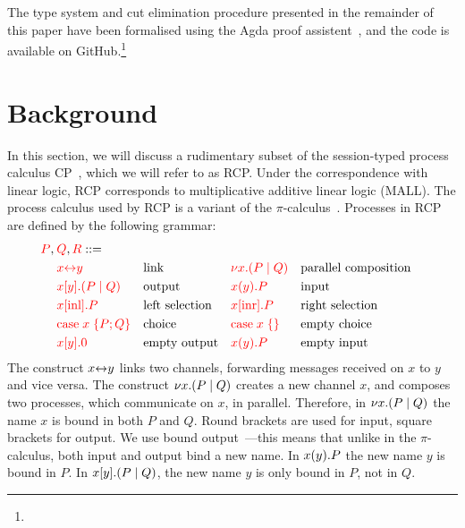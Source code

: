 \documentclass[a4paper,UKenglish]{lipics-v2016}
\begin{document}
The type system and cut elimination procedure presented in the remainder of this
paper have been formalised using the Agda proof assistent~\cite{norell2009}, and
the code is available on GitHub.\footnote{
}

\section{Background}
In this section, we will discuss a rudimentary subset of the session-typed
process calculus CP~\cite{wadler2012}, which we will refer to as RCP.
Under the correspondence with linear logic, RCP corresponds to multiplicative
additive linear logic (MALL).
The process calculus used by RCP is a variant of the
$\pi$-calculus~\cite{milner1992}. Processes in RCP are defined by the following
grammar:
\[
  \begin{aligned}
    \red{P},\:&\red{Q},\red{R} ::=\\
    & \red{\link{x}{y}}           &&\text{link}
    &&\red{\cut{x}(P \mid Q)}     &&\text{parallel composition}\\
    & \red{\send{x}{y}(P \mid Q)} &&\text{output}
    &&\red{\recv{x}{y}P}          &&\text{input}\\
    & \red{\inl{x}P}              &&\text{left selection}
    &&\red{\inr{x}P}              &&\text{right selection}\\
    & \red{\case{x}{P}{Q}}        &&\text{choice}
    &&\red{\case{x}{}{}}          &&\text{empty choice}\\
    & \red{\send{x}{y}0}          &&\text{empty output}
    &&\red{\recv{x}{y}P}          &&\text{empty input}\\
  \end{aligned}
\]
The construct ${x{\leftrightarrow}y}$ links two channels, forwarding messages received on
$x$ to $y$ and vice versa.
%
The construct ${\nu x.}{(P \mid Q)}$ creates a new channel $x$, and composes two
processes, which communicate on $x$, in parallel.
Therefore, in ${\nu x.}{(P \mid Q)}$ the name $x$ is bound in both $P$ and $Q$. 
%
Round brackets are used for input, square brackets for output.
We use bound output~\cite{sangiorgi1996}---this means that unlike in the
$\pi$-calculus, both input and output bind a new name.
In ${x(y).}P$ the new name $y$ is bound in $P$.
In ${x[y].}{(P \mid Q)}$, the new name $y$ is only bound in $P$, not in $Q$.
\end{document}
